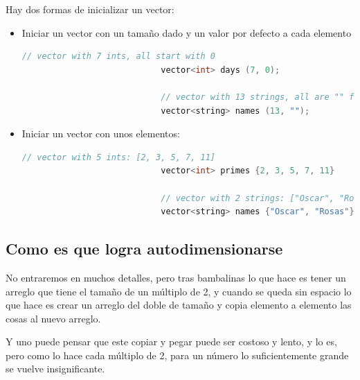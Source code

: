 \documentclass[12pt, fleqn]{report}                             %
\theoremstyle{break}                                            %
\begin{document}
                Hay dos formas de inicializar un vector:
                \begin{itemize}
                    \item Iniciar un vector con un tamaño dado y un valor por defecto a cada elemento
                        \begin{lstlisting}[language=C++, gobble=28]
                            // vector with 7 ints, all start with 0
                            vector<int> days (7, 0);        

                            // vector with 13 strings, all are "" for now
                            vector<string> names (13, "");  
                        \end{lstlisting}

                    \item Iniciar un vector con unos elementos:
                        \begin{lstlisting}[language=C++, gobble=28]
                            // vector with 5 ints: [2, 3, 5, 7, 11]
                            vector<int> primes {2, 3, 5, 7, 11}     

                            // vector with 2 strings: ["Oscar", "Rosas"]
                            vector<string> names {"Oscar", "Rosas"} 
                        \end{lstlisting}
                \end{itemize}

            \subsection{Como es que logra autodimensionarse}

                No entraremos en muchos detalles, pero tras bambalinas lo que hace es tener un arreglo
                que tiene el tamaño de un múltiplo de 2, y cuando se queda sin espacio lo que hace
                es crear un arreglo del doble de tamaño y copia elemento a elemento las cosas al 
                nuevo arreglo.

                Y uno puede pensar que este copiar y pegar puede ser costoso y lento, y lo es, pero
                como lo hace cada múltiplo de 2, para un número lo suficientemente grande se vuelve
                insignificante.
\end{document}
